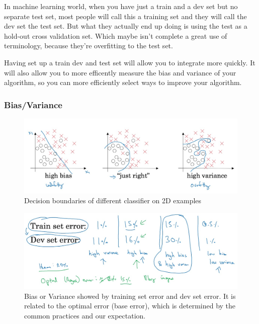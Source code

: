 \documentclass[UTF8]{article}
\begin{document}
In machine learning world, when you have just a train and a dev set but no separate test set, most
people will call this a training set and they will call the dev set the test set. But what they
actually end up doing is using the test as a hold-out cross validation set. Which maybe isn't
complete a great use of terminology, because they're overfitting to the test set.

Having set up a train dev and test set will allow you to integrate more quickly. It will also allow
you to more efficently measure the bias and variance of your algorithm, so you can more efficiently
select ways to improve your algorithm.

\subsubsection{Bias/Variance}
\begin{figure}[htb]
    \centering
    \includegraphics[width=40em]{figures/bias-and-variance-1}
    \caption{Decision boundaries of different classifier on 2D examples}
\end{figure}

\begin{figure}[htb]
    \centering
    \includegraphics[width=40em]{figures/bias-and-variance-2}
    \caption{Bias or Variance showed by training set error and dev set error. It is related to the
    optimal error (base error), which is determined by the common practices and our expectation.}
\end{figure}
\end{document}
